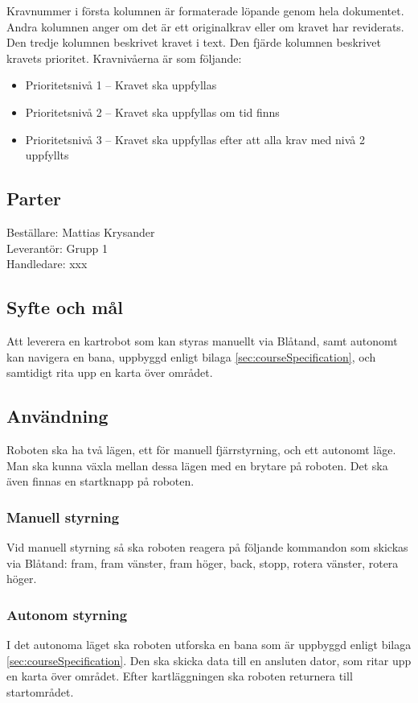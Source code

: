 \documentclass[a4paper,11pt]{article}
\newcommand{\LIPSprojektgrupp}{Grupp 1}
\begin{document}
Kravnummer i första kolumnen är formaterade löpande genom hela dokumentet. Andra kolumnen anger om det är ett originalkrav eller om kravet har reviderats. Den tredje kolumnen beskrivet kravet i text. Den fjärde kolumnen beskrivet kravets prioritet. Kravnivåerna är som följande:
\begin{itemize}
    \item Prioritetsnivå 1 – Kravet ska uppfyllas
    \item Prioritetsnivå 2 – Kravet ska uppfyllas om tid finns
    \item Prioritetsnivå 3 – Kravet ska uppfyllas efter att alla krav med nivå 2 uppfyllts 
\end{itemize}
\subsection{Parter}
Beställare: Mattias Krysander \\
Leverantör: \LIPSprojektgrupp \\
Handledare: xxx 

\subsection{Syfte och mål}
Att leverera en kartrobot som kan styras manuellt via Blåtand, samt autonomt kan navigera en bana, uppbyggd enligt bilaga \ref{sec:courseSpecification}, och samtidigt rita upp en karta över området.  
\subsection{Användning}
Roboten ska ha två lägen, ett för manuell fjärrstyrning, och ett autonomt läge. Man ska kunna växla mellan dessa lägen med en brytare på roboten. Det ska även finnas en startknapp på roboten. 
\subsubsection{Manuell styrning}
Vid manuell styrning så ska roboten reagera på följande kommandon som skickas via Blåtand: fram, fram vänster, fram höger, back, stopp, rotera vänster, rotera höger. 
\subsubsection{Autonom styrning}
I det autonoma läget ska roboten utforska en bana som är uppbyggd enligt bilaga \ref{sec:courseSpecification}. Den ska skicka data till en ansluten dator, som ritar upp en karta över området. Efter kartläggningen ska roboten returnera till startområdet. 
\end{document}
